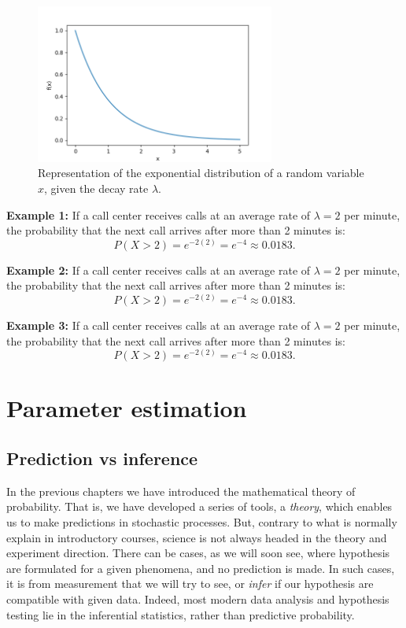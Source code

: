 \documentclass{book}
\begin{document}
\begin{figure}[ht]
    \centering
    \includegraphics[width=0.7\textwidth]{figures/chapter2/exponential.png}
    \caption{Representation of the exponential distribution of a random variable $x$, given the decay rate $\lambda$.}
    \label{fig:random}
\end{figure}

\textbf{Example 1:} If a call center receives calls at an average rate of $\lambda = 2$ per minute, the probability that the next call arrives after more than 2 minutes is:
\begin{equation}
    P(X > 2) = e^{-2(2)} = e^{-4} \approx 0.0183.
\end{equation}

\textbf{Example 2:} If a call center receives calls at an average rate of $\lambda = 2$ per minute, the probability that the next call arrives after more than 2 minutes is:
\begin{equation}
    P(X > 2) = e^{-2(2)} = e^{-4} \approx 0.0183.
\end{equation}

\textbf{Example 3:} If a call center receives calls at an average rate of $\lambda = 2$ per minute, the probability that the next call arrives after more than 2 minutes is:
\begin{equation}
    P(X > 2) = e^{-2(2)} = e^{-4} \approx 0.0183.
\end{equation}

\chapter{Parameter estimation}

\section{Prediction vs inference}
In the previous chapters we have introduced the mathematical theory of probability. That is, we have developed a series of tools, a \textit{theory}, which enables us to make predictions in stochastic processes. But, contrary to what is normally explain in introductory courses, science is not always headed in the theory and experiment direction. There can be cases, as we will soon see, where hypothesis are formulated for a given phenomena, and no prediction is made. In such cases, it is from measurement that we will try to see, or \textit{infer} if our hypothesis are compatible with given data. Indeed, most modern data analysis and hypothesis testing lie in the inferential statistics, rather than predictive probability.
\end{document}
